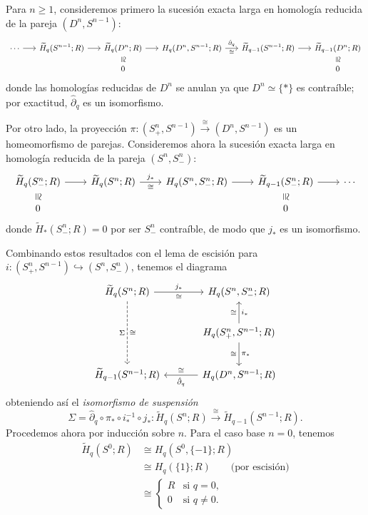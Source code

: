 \begin{dem}
Para $n \geq 1$, consideremos primero la sucesión exacta larga en homología reducida de la pareja $(D^n, S^{n-1})$:
\[
{\small
\begin{tikzcd}[column sep=1.6em, row sep=1.0em]
\cdots \arrow[r]
& \widetilde{H}_q(S^{n-1}; R) \arrow[r]
& \widetilde{H}_q(D^n; R) \arrow[r] \arrow[d, phantom, "\cong"{description, sloped, inner sep=1pt}]
& H_q(D^n, S^{n-1}; R) \arrow[r, "\hat{\partial}_q", "\cong"']
& \widetilde{H}_{q-1}(S^{n-1}; R) \arrow[r]
& \widetilde{H}_{q-1}(D^n; R) \arrow[d, phantom, "\cong"{description, sloped, inner sep=1pt}] \\
& & 0 & & & 0
\end{tikzcd}}
\]
donde las homologías reducidas de $D^n$ se anulan ya que $D^n \simeq \{*\}$ es contraíble; por exactitud, $\hat{\partial}_q$ es un isomorfismo.

Por otro lado, la proyección $\pi \colon (S_+^n, S^{n-1}) \xrightarrow{\;\cong\;} (D^n, S^{n-1})$ es un homeomorfismo de parejas. Consideremos ahora la sucesión exacta larga en homología reducida de la pareja $(S^n, S_-^n)$:
\[
\begin{tikzcd}[column sep=2.2em, row sep=1.0em]
\widetilde{H}_q(S_-^n; R) \arrow[r] \arrow[d, phantom, "\cong"{description, sloped, inner sep=1pt}]
& \widetilde{H}_q(S^n; R) \arrow[r, "j_*", "\cong"']
& H_q(S^n, S_-^n; R) \arrow[r]
& \widetilde{H}_{q-1}(S_-^n; R) \arrow[r] \arrow[d, phantom, "\cong"{description, sloped, inner sep=1pt}]
& \cdots \\
0 & & & 0
\end{tikzcd}
\]
donde $\widetilde{H}_*(S_-^n; R) = 0$ por ser $S_-^n$ contraíble, de modo que $j_*$ es un isomorfismo.

Combinando estos resultados con el lema de escisión para $i \colon (S_+^n, S^{n-1}) \hookrightarrow (S^n, S_-^n)$, tenemos el diagrama
\[
\begin{tikzcd}[column sep=3.4em, row sep=2.2em]
\widetilde{H}_q(S^n; R)
    \arrow[r, "j_*", "\cong"']
    \arrow[dd, dashed, "\Sigma"', "\cong"]
    & H_q(S^n, S_-^n; R) \\
    & H_q(S_+^n, S^{n-1}; R)
        \arrow[u, "i_*"', "\cong"]
        \arrow[d, "\pi_*", "\cong"'] \\
\widetilde{H}_{q-1}(S^{n-1}; R)
    & H_q(D^n, S^{n-1}; R)
        \arrow[l, "\hat{\partial}_q", "\cong"']
\end{tikzcd}
\]
obteniendo así el \textit{isomorfismo de suspensión}
\[
\Sigma = \hat{\partial}_q \circ \pi_* \circ i_*^{-1} \circ j_* \colon \widetilde{H}_q(S^n; R) \xrightarrow{\;\cong\;} \widetilde{H}_{q-1}(S^{n-1}; R).
\]
Procedemos ahora por inducción sobre $n$. Para el caso base $n = 0$, tenemos
\begin{align*}
\widetilde{H}_q(S^0; R) &\cong H_q(S^0, \{-1\}; R) \\
&\cong H_q(\{1\}; R) \qquad \text{(por escisión)} \\
&\cong
\begin{cases}
R & \text{si } q = 0, \\
0 & \text{si } q \neq 0.
\end{cases}
\end{align*}


\end{dem}
